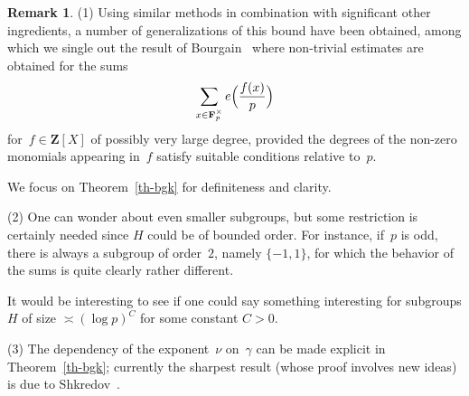 \documentclass[12pt]{amsart}
\numberwithin{equation}{section}
\newcommand{\Zz}{\mathbf{Z}}
\newcommand{\Ff}{\mathbf{F}}
\newcommand{\mods}[1]{\,(\mathrm{mod}\,{#1})}
\theoremstyle{plain}
\theoremstyle{remark}
\theoremstyle{definition}
\newtheorem{remark}[theorem]{Remark}
\begin{document}
\begin{remark}
  (1) Using similar methods in combination with significant other
  ingredients, a number of generalizations of this bound have been
  obtained, among which we single out the result of
  Bourgain~\cite{bourgain-mordell} where non-trivial estimates are
  obtained for the sums
  $$
  \sum_{x\in \Ff_p^{\times}}e\Bigl(\frac{f(x)}{p}\Bigr)
  $$
  for~$f\in\Zz[X]$ of possibly very large degree, provided the degrees
  of the non-zero monomials appearing in~$f$ satisfy suitable conditions
  relative to~$p$.

  We focus on Theorem~\ref{th-bgk} for definiteness and clarity.

  (2) One can wonder about even smaller subgroups, but some restriction
  is certainly needed since $H$ could be of bounded order. For instance,
  if~$p$ is odd, there is always a subgroup of order~$2$, namely
  $\{-1,1\}$, for which the behavior of the sums is quite clearly rather
  different.

  It would be interesting to see if one could say something interesting
  for subgroups $H$ of size $\asymp (\log p)^{C}$ for some constant
  $C>0$.
  

  (3) The dependency of the exponent~$\nu$ on~$\gamma$ can be made
  explicit in Theorem~\ref{th-bgk}; currently the sharpest result (whose
  proof involves new ideas) is due to
  Shkredov~\cite[Cor.\,16]{shkredov}. 
\end{remark}
\end{document}
